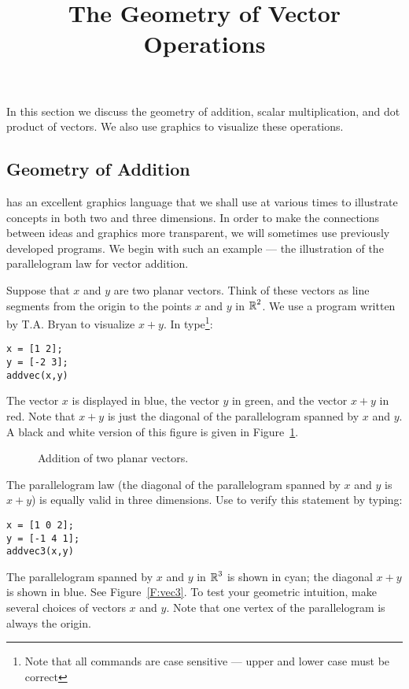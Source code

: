 \documentclass{ximera}
\title{The Geometry of Vector Operations}
\begin{document}
\begin{abstract}
\end{abstract}
\maketitle


\label{S:1.4}

In this section we discuss the geometry of addition, scalar
multiplication, and dot product of vectors.  We also use \Matlab
graphics to visualize these operations.


\subsection*{Geometry of Addition} 

\Matlab has an excellent graphics language that we shall use
at various times to illustrate concepts in both two and three
dimensions.  In order to make the connections between ideas and
graphics more transparent, we will sometimes use previously
developed \Matlab programs.  We begin with such an example ---
the illustration of the parallelogram law
for vector addition.

Suppose that $x$ and $y$ are two planar vectors.  Think of these
vectors as line segments from the origin to the points $x$ and
$y$ in $\mbox{$\Bbb{R}$}^2$. We use a program written by T.A. Bryan to
visualize $x+y$.  In \Matlab type\footnote{Note that all \Matlab
commands are case sensitive --- upper and lower case must be correct}:
\begin{verbatim}
x = [1 2];
y = [-2 3];
addvec(x,y)
\end{verbatim}  
The vector $x$ is displayed in blue, the vector $y$ in green,
and the vector $x+y$ in red.  Note that $x+y$ is just the diagonal
of the parallelogram spanned by $x$ and $y$.  A black and white
version of this figure is given in Figure~\ref{F:vec2}.

\begin{figure}[htb]
         \centerline{%
         }
         \caption{Addition of two planar vectors.}
         \label{F:vec2}
\end{figure}


The parallelogram law (the diagonal of the parallelogram spanned
by $x$ and $y$ is $x+y$) is equally valid in three dimensions.
Use \Matlab to verify this statement by typing:
\begin{verbatim}
x = [1 0 2];
y = [-1 4 1];
addvec3(x,y)
\end{verbatim} 
The parallelogram spanned by $x$ and $y$ in $\mbox{$\Bbb{R}$}^3$ is shown in
cyan; the diagonal $x+y$ is shown in blue.  See Figure~\ref{F:vec3}.   
To test your geometric intuition, make several choices of vectors $x$ and
$y$.  Note that one vertex of the parallelogram is always the
origin.
\end{document}
